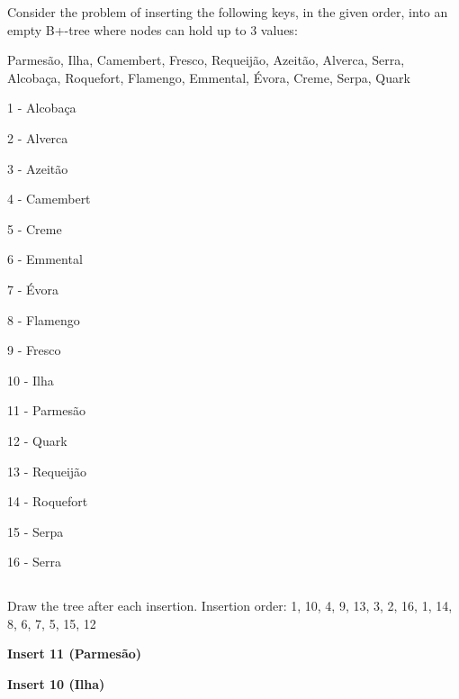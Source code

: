 

	{\color{gray}Consider the problem of inserting the following keys, in the given order, into an empty B+-tree where nodes can hold up to 3 values:}
	
	{\color{gray}Parmesão, Ilha, Camembert, Fresco, Requeijão, Azeitão, Alverca, Serra, Alcobaça, Roquefort, Flamengo, Emmental, Évora, Creme, Serpa, Quark}

1 - Alcobaça

2 - Alverca

3 - Azeitão

4 - Camembert

5 - Creme

6 - Emmental

7 - Évora

8 - Flamengo

9 - Fresco

10 - Ilha

11 - Parmesão

12 - Quark

13 - Requeijão

14 - Roquefort

15 - Serpa

16 - Serra

	\subsection{}
	{\color{gray}Draw the tree after each insertion.}
 		Insertion order: 1, 10, 4, 9, 13, 3, 2, 16, 1, 14, 8, 6, 7, 5, 15, 12



\textbf{Insert 11 (Parmesão)}
\begin{center}
\end{center}

\textbf{Insert 10 (Ilha)}
\begin{center}
\end{center}

